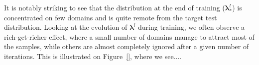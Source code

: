 \documentclass[11pt,a4paper]{article}
\newcommand{\fyTodo}[1]{\Todo[FY:]{\textcolor{orange}{#1}}}
\newcommand{\fyDone}[1]{\done[FY]\Todo[FY:]{\textcolor{orange}{#1}}}
\newcommand{\domain}[1]{\texttt{\textsc{#1}}}
\newcommand{\system}[1]{\texttt{{#1}}}
\newcommand{\vlambda}{\ensuremath{\boldsymbol\lambda}\xspace} %
\begin{document}
\fyTodo{Fixed regime with target mixture weigths ?}
\fyDone{This table does not work- One line would be enough, where we compare autoFT with true FT}
\fyTodo{Curves for bank / medical ou law}
\fyTodo{Fine tune pour 2 domains ?}

It is notably striking to see that the distribution at the end of training ($\vlambda^l_*$) is concentrated on few domains and is quite remote from the target test distribution. Looking at the evolution of $\vlambda^l$ during training, we often observe a rich-get-richer effect, where a small number of domains manage to attract most of the samples, while others are almost completely ignored after a given number of iterations. This is illustrated on Figure~\ref{}, where we see....\fyTodo{Provide illustrations and numbers}
\end{document}
